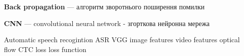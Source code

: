 \shortings

\textbf{Back propagation} --- алгоритм зворотнього поширення помилки  

\textbf{CNN} --- convolutional neural network - згорткова нейронна мережа

Automatic speech recogintion ASR
VGG
image features
video features
optical flow
CTC loss
loss function